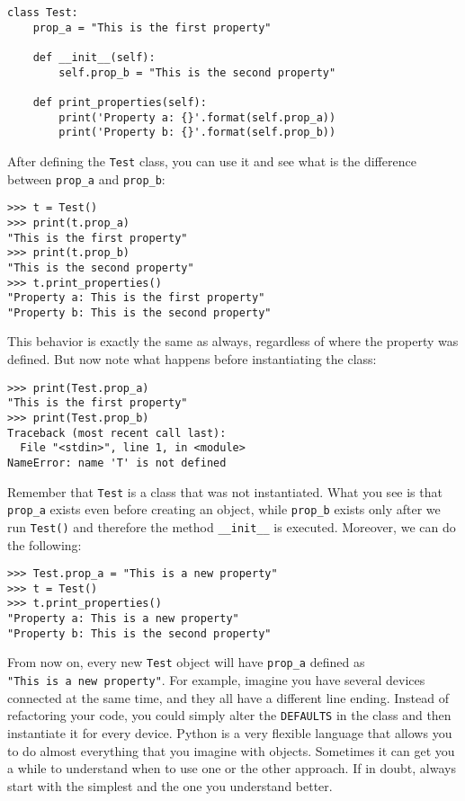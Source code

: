 \begin{verbatim}
class Test:
    prop_a = "This is the first property"

    def __init__(self):
        self.prop_b = "This is the second property"

    def print_properties(self):
        print('Property a: {}'.format(self.prop_a))
        print('Property b: {}'.format(self.prop_b))
\end{verbatim}

After defining the \texttt{Test} class, you can use it and see what is
the difference between \texttt{prop\_a} and \texttt{prop\_b}:

\begin{verbatim}
>>> t = Test()
>>> print(t.prop_a)
"This is the first property"
>>> print(t.prop_b)
"This is the second property"
>>> t.print_properties()
"Property a: This is the first property"
"Property b: This is the second property"
\end{verbatim}

This behavior is exactly the same as always, regardless of where the
property was defined. But now note what happens before instantiating
the class:

\begin{verbatim}
>>> print(Test.prop_a)
"This is the first property"
>>> print(Test.prop_b)
Traceback (most recent call last):
  File "<stdin>", line 1, in <module>
NameError: name 'T' is not defined
\end{verbatim}

Remember that \texttt{Test} is a class that was not instantiated. What
you see is that \texttt{prop\_a} exists even before creating an object,
while \texttt{prop\_b} exists only after we run \texttt{Test()} and
therefore the method \texttt{\_\_init\_\_} is executed. Moreover, we can
do the following:

\begin{verbatim}
>>> Test.prop_a = "This is a new property"
>>> t = Test()
>>> t.print_properties()
"Property a: This is a new property"
"Property b: This is the second property"
\end{verbatim}

From now on, every new \texttt{Test} object will have \texttt{prop\_a}
defined as \texttt{"This\ is\ a\ new\ property"}. For example, imagine
you have several devices connected at the same time, and they all have a
different line ending. Instead of refactoring your code, you could
simply alter the \texttt{DEFAULTS} in the class and then instantiate it
for every device. Python is a very flexible language that allows you to
do almost everything that you imagine with objects. Sometimes it can get
you a while to understand when to use one or the other approach. If in
doubt, always start with the simplest and the one you understand better.
